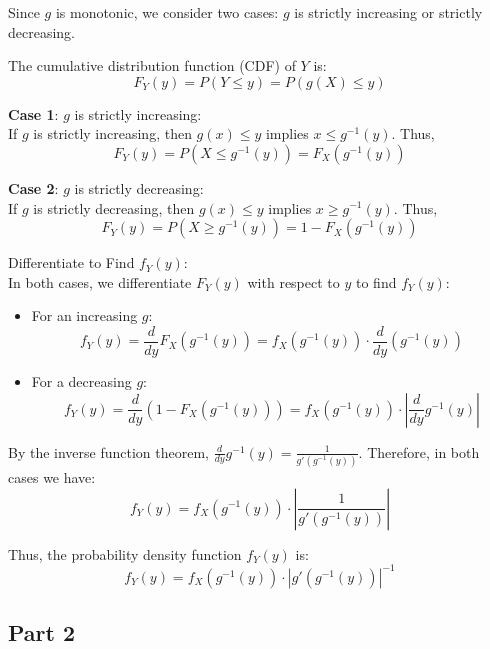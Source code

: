\documentclass{article}
\begin{document}
Since \( g \) is monotonic, we consider two cases: \( g \) is strictly increasing or strictly decreasing.

The cumulative distribution function (CDF) of \( Y \) is:
   \[
   F_Y(y) = P(Y \leq y) = P(g(X) \leq y)
   \]

\textbf{Case 1}: \( g \) is strictly increasing:\\
If \( g \) is strictly increasing, then \( g(x) \leq y \) implies \( x \leq g^{-1}(y) \). Thus,
   \[
   F_Y(y) = P(X \leq g^{-1}(y)) = F_X(g^{-1}(y))
   \]

\textbf{Case 2}: \( g \) is strictly decreasing:\\
If \( g \) is strictly decreasing, then \( g(x) \leq y \) implies \( x \geq g^{-1}(y) \). Thus,
   \[
   F_Y(y) = P(X \geq g^{-1}(y)) = 1 - F_X(g^{-1}(y))
   \]

Differentiate to Find \( f_Y(y) \):\\
   In both cases, we differentiate \( F_Y(y) \) with respect to \( y \) to find \( f_Y(y) \):\\
   
   \begin{itemize}
       \item For an increasing \( g \):\\     
\begin{equation*}
     f_Y(y) = \frac{d}{dy} F_X(g^{-1}(y)) = f_X(g^{-1}(y)) \cdot \frac{d}{dy} \left( g^{-1}(y) \right)
    \end{equation*}
           \item For a decreasing \( g \):\\     
\begin{equation*}    
     f_Y(y) = \frac{d}{dy} \left( 1 - F_X(g^{-1}(y)) \right) = f_X(g^{-1}(y)) \cdot \left| \frac{d}{dy} g^{-1}(y) \right|
\end{equation*}
     
\end{itemize}

By the inverse function theorem, \( \frac{d}{dy} g^{-1}(y) = \frac{1}{g'(g^{-1}(y))} \). Therefore, in both cases we have:
   \[
   f_Y(y) = f_X(g^{-1}(y)) \cdot \left| \frac{1}{g'(g^{-1}(y))} \right|
   \]

Thus, the probability density function \( f_Y(y) \) is:
   \[
   f_Y(y) = f_X(g^{-1}(y)) \cdot \left| g'(g^{-1}(y)) \right|^{-1}
   \]
\subsection*{Part 2}
\end{document}
